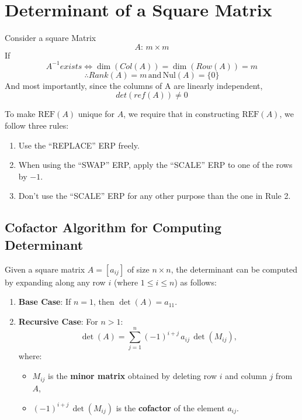 \documentclass{report}
\begin{document}
\section{Determinant of a Square Matrix}
Consider a square Matrix
\[
	A: \, m \times m
\]
If
\[
	A^{-1} exists \Leftrightarrow \dim(Col(A)) = \dim(Row(A)) = m
\]
\[
	\therefore Rank(A) = m \, \text{and} \, \text{Nul}(A) = \{0\}
\]
And most importantly, since the columns of A are linearly independent,
\[
	det(ref(A)) \neq 0
\]


\vspace{0.5cm}
To make $\text{REF}(A)$ unique for $A$, we require that in constructing $\text{REF}(A)$, we follow three rules:

\begin{enumerate}
	\item Use the ``REPLACE'' ERP freely.
	\item When using the ``SWAP'' ERP, apply the ``SCALE'' ERP to one of the rows by $-1$.
	\item Don't use the ``SCALE'' ERP for any other purpose than the one in Rule 2.
\end{enumerate}

\subsection{Cofactor Algorithm for Computing Determinant}


Given a square matrix \( A = [a_{ij}] \) of size \( n \times n \), the determinant can be computed by expanding along any row \( i \) (where \( 1 \leq i \leq n \)) as follows:

\begin{enumerate}
	\item \textbf{Base Case}: If \( n = 1 \), then \( \det(A) = a_{11} \).

	\item \textbf{Recursive Case}: For \( n > 1 \):
	      \[
		      \det(A) = \sum_{j=1}^n (-1)^{i+j} \, a_{ij} \, \det(M_{ij}),
	      \]
	      where:
	      \begin{itemize}
		      \item \( M_{ij} \) is the \textbf{minor matrix} obtained by deleting row \( i \) and column \( j \) from \( A \),
		      \item \( (-1)^{i+j} \, \det(M_{ij}) \) is the \textbf{cofactor} of the element \( a_{ij} \).
	      \end{itemize}
\end{enumerate}
\end{document}
